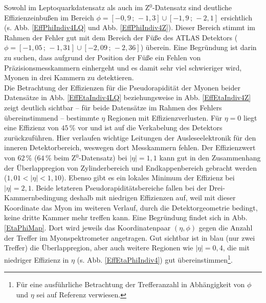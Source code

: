 Sowohl im Leptoquarkdatensatz als auch im Z$^0$-Datensatz sind deutliche Effizienzeinbußen im Bereich $\phi=[-0,9\,;\,-1,3]\cup[-1,9\,;\,-2,1]$ ersichtlich (s. Abb. \ref{EffPhiIndiv4LQ} und Abb. \ref{EffPhiIndiv4Z}). Dieser Bereich stimmt im Rahmen der Fehler gut mit dem Bereich der Füße des ATLAS Detektors ($\phi=[-1,05\,;\,-1,31]\cup[-2,09\,;\,-2,36]$) überein. %
Eine Begründung ist darin zu suchen, dass aufgrund der Position der Füße ein Fehlen von Präzisionsmesskammern einhergeht und es damit sehr viel schwieriger wird, Myonen in drei Kammern zu detektieren.\\ 
Die Betrachtung der Effizienzen für die Pseudorapidität der Myonen beider Datensätze in Abb. \ref{EffEtaIndiv4LQ} beziehungsweise in Abb. \ref{EffEtaIndiv4Z} zeigt deutlich sichtbar -- für beide Datensätze im Rahmen des Fehlers übereinstimmend -- bestimmte $\eta$ Regionen mit Effizienzverlusten. Für $\eta=0$ liegt eine Effizienz von $45\,\%$ vor und ist auf die Verkabelung des Detektors zurückzuführen. Hier verlaufen wichtige Leitungen der Ausleseelektronik für den inneren Detektorbereich, weswegen dort Messkammern fehlen. Der Effizienzwert von $62\,\%$ ($64\,\%$ beim Z$^0$-Datensatz) bei $|\eta|=1,1$ kann gut in den Zusammenhang der Überlappregion von Zylinderbereich und Endkappenbereich gebracht werden ($1,01<|\eta|<1,10$). Ebenso gibt es ein lokales Minimum der Effizienz bei $|\eta|=2,1$. Beide letzteren Pseudorapiditätsbereiche fallen bei der Drei-Kammernbedingung deshalb mit niedrigen Effizienzen auf, weil mit dieser Koordinate das Myon im weiteren Verlauf, durch die Detektorgeometrie bedingt, keine dritte Kammer mehr treffen kann. Eine Begründung findet sich in Abb. \ref{EtaPhiMap}. Dort wird jeweils das Koordinatenpaar $(\eta,\phi)$ gegen die Anzahl der Treffer im Myonspektrometer angetragen. Gut sichtbar ist in blau (nur zwei Treffer) die Überlappregion, aber auch weitere Regionen wie $|\eta|=0,4$, die mit niedriger Effizienz in $\eta$ (s. Abb. \ref{EffEtaPhiIndiv4}) gut übereinstimmen\footnote{Für eine ausführliche Betrachtung der Trefferanzahl in Abhängigkeit von $\phi$ und $\eta$ sei auf Referenz \cite{KammernCount} verwiesen.}.
  
